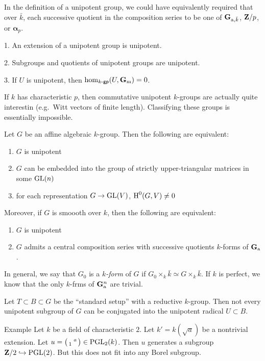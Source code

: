 In the definition of a unipotent group, we could have equivalently required that 
over $\bar k$, each successive quotient in the composition series to be one of 
$\mathbf{G}_{\mathrm{a},\bar k}$, $\mathbf{Z}/p$, or $\boldsymbol\alpha_p$. 

\begin{lemm}
1. An extension of a unipotent group is unipotent. 

2. Subgroups and quotients of unipotent groups are unipotent. 

3. If $U$ is unipotent, then $\hom_{k\textnormal{-}\mathsf{gp}}(U,\mathbf{G}_{\mathrm{m}}) = 0$. 
\end{lemm}

If $k$ has characteristic $p$, then commutative unipotent $k$-groups are 
actually quite interestin (e.g.\ Witt vectors of finite length). Classifying 
these groups is essentially impossible. 

\begin{prop}
Let $G$ be an affine algebraic $k$-group. Then the following are equivalent: 
\begin{enumerate}
  \item $G$ is unipotent 
  \item $G$ can be embedded into the group of strictly upper-triangular 
    matrices in some $\operatorname{GL}(n)$
  \item for each representation $G\to \operatorname{GL}(V)$, $\operatorname{H}^0(G,V)\ne 0$
\end{enumerate}
Moreover, if $G$ is smoooth over $k$, then the following are equivalent:
\begin{enumerate}
  \item $G$ is unipotent
  \item $G$ admits a central composition series with successive quotients 
    $k$-forms of $\mathbf{G}_{\mathrm{a}}$. 
\end{enumerate}
\end{prop}

In general, we say that $G_0$ is a \emph{$k$-form} of $G$ if 
$G_0\times_k \bar k\simeq G\times_k \bar k$. If $k$ is perfect, we know that 
the only $k$-frms of $\mathbf{G}_{\mathrm{a}}^n$ are trivial. 

Let $T\subset B\subset G$ be the ``standard setup'' with a reductive 
$k$-group. Then not every unipotent subgroup of $G$ can be conjugated into 
the unipotent radical $U\subset B$. 

\begin{enonce}[remark]{Example}
Let $k$ be a field of characteristic $2$. Let $k'=k(\sqrt a)$ be a nontrivial 
extension. Let $u=\bigl(\begin{smallmatrix}  & a \\ 1 &  \end{smallmatrix} \bigr)\in \operatorname{PGL}_2(k)$. Then 
$u$ generates a subgroup $\mathbf{Z}/2\hookrightarrow \operatorname{PGL}(2)$. But 
this does not fit into any Borel subgroup. 
\end{enonce}

